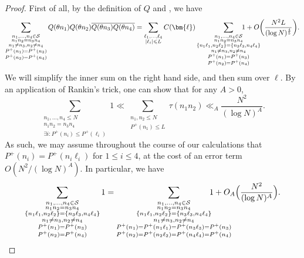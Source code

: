 \documentclass[12pt]{amsart}
\renewcommand{\leq}{\leqslant}
\numberwithin{equation}{section}
\theoremstyle{plain}
\theoremstyle{definition}
\renewcommand{\l}{\ell}
\newcommand{\CS}{\mathcal{S}}
\begin{document}
	\begin{proof}
		First of all, by the definition of $Q$ and , we have
		\begin{equation}\label{eq: verif cond 2 first}
			\sum_{\substack{n_1,\dots,n_4 \in \CS \\ n_1n_2=n_3n_4 \\ n_1 \ne n_3,n_2 \ne n_4 \\ P^+(n_1)=P^+(n_3) \\ P^+(n_2) = P^+(n_4)}}Q(\theta n_1)Q(\theta n_2)\overline{Q(\theta n_3)Q(\theta n_4)}= \sum_{\substack{\l_1,\dots,\l_4 \\ |\l_i| \leq L}} C(\bm{\l}) \sum_{\substack{n_1,\dots,n_4 \in \CS \\ n_1n_2=n_3n_4 \\ \{n_1\l_1,n_2\l_2\}=\{n_3\l_3,n_4\l_4\} \\ n_1 \ne n_3,n_2 \ne n_4 \\ P^+(n_1)=P^+(n_3) \\ P^+(n_2) = P^+(n_4) }} \hspace{-1cm} 1 +O\bigg(\frac{N^2 L}{(\log N)^{\frac{4}{5}}}\bigg).
		\end{equation}
		We will simplify the inner sum on the right hand side, and then sum over $\l$. By an application of Rankin's trick, one can show that for any $A>0$,
		\begin{equation}\label{eq: replace Pn Pnl}
			\sum_{\substack{n_1,\dots,n_4 \leq N \\ n_1n_2 = n_3n_4 \\ \exists i : P^+(n_i) \leq P^+(\l_i)}} 1 \ll \sum_{\substack{n_1,n_2 \leq N \\ P^+(n_1) \leq L}} \tau(n_1n_2) \ll_A \frac{N^2}{(\log N)^A}.
		\end{equation}
		As such, we may assume throughout the course of our calculations that $P^+(n_i) = P^+(n_i\l_i)$ for $1 \leq i \leq 4$, at the cost of an error term $O(N^2/(\log N)^A)$. In particular, we have
		\begin{equation}\label{eq:intermed 1} 
			\sum_{\substack{n_1,\dots,n_4 \in \CS \\ n_1n_2=n_3n_4 \\ \{n_1\l_1,n_2\l_2\}=\{n_3\l_3,n_4\l_4\} \\ n_1 \ne n_3,n_2 \ne n_4 \\ P^+(n_1)=P^+(n_3) \\ P^+(n_2) = P^+(n_4)}} 1 = \sum_{\substack{n_1,\dots,n_4 \in \CS \\ n_1n_2=n_3n_4 \\ \{n_1\l_1,n_2\l_2\}=\{n_3\l_3,n_4\l_4\} \\ n_1 \ne n_3,n_2 \ne n_4 \\ P^+(n_1)=P^+(n_1 \l_1)=P^+(n_3 \l_3) = P^+(n_3) \\ P^+(n_2) = P^+(n_2 \l_2) = P^+(n_4 \l_4) = P^+(n_4) }} \hspace{-1cm} 1 + O_A\Big(\frac{N^2}{(\log N)^A}\Big).

\end{equation}
\end{proof}
\end{document}
